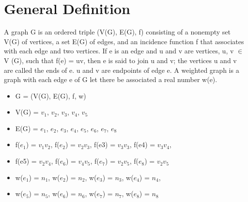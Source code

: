 \documentclass[12pt]{article}
\begin{document}
\section{General Definition}
A graph G is an ordered triple (V(G), E(G), f) consisting of a nonempty set V(G) of vertices, a set E(G) of edges, 
and an incidence function f that associates with each edge and two vertices. If e is an edge and u and v are vertices, 
u, v $\in$  V (G), such that f(e) = uv, then e is said to join u and v; the vertices u and v are called the ends of e. u 
and v are endpoints of edge e. A weighted graph is a graph with each edge e of G let there be associated a real number w(e).
\begin{itemize}
    \item G = (V(G), E(G), f, w)
    \item V(G) = {$v_1$, $v_2$, $v_3$, $v_4$, $v_5$}
    \item E(G) = {$e_1$, $e_2$, $e_3$, $e_4$, $e_5$, $e_6$, $e_7$, $e_8$}
    \item f($e_1$) = $v_1v_2$, f($e_2$) = $v_2v_3$, f(e3) = $v_3v_3$, f(e4) = $v_3v_4$, 
    \item f(e5) = $v_2v_4$, f($e_6$) = $v_4v_5$, f($e_7$) = $v_2v_5$, f($e_8$) = $v_2v_5$
    \item w($e_1$) = $n_1$, w($e_2$) = $n_2$, w($e_3$) = $n_3$, w($e_4$) = $n_4$,
    \item w($e_5$) = $n_5$, w($e_6$) = $n_6$, w($e_7$) = $n_7$, w($e_8$) = $n_8$
\end{itemize}
\end{document}

